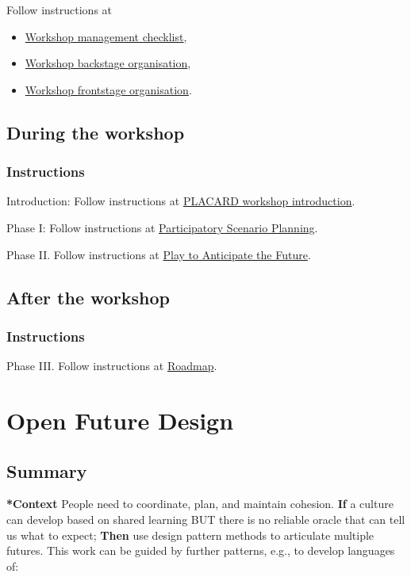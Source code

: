 \documentclass{article}
\begin{document}
Follow instructions at
\begin{itemize}
\item \hyperref[e28fb669-45a6-4916-b56b-a3afd6238d4f]{Workshop management checklist},
\item \hyperref[781d52fa-71a9-4c90-b4f6-9b0dd4244c33]{Workshop backstage organisation},
\item \hyperref[2a01f142-31c7-4e86-ae10-e14e85b4dda9]{Workshop frontstage organisation}.
\end{itemize}

\subsection{During the workshop}
\label{c8823bc4-d08e-4486-9841-c914bba9977e}
\subsubsection{Instructions}

Introduction: Follow instructions at \hyperref[b7b42aa2-c57c-4bcc-bc45-be9b63972be7]{PLACARD workshop introduction}.

Phase I: Follow instructions at \hyperref[95072d03-1359-4863-bad1-651191eb2f38]{Participatory Scenario Planning}.

Phase II. Follow instructions at \hyperref[85fefbc1-ca57-46fa-a8b2-154821a56c75]{Play to Anticipate the Future}.
\subsection{After the workshop}
\label{3d0acf49-0c87-4aaa-94b3-84e5d926d58d}
\subsubsection{Instructions}

Phase III. Follow instructions at \hyperref[92e18906-d0e6-4e73-a9cf-fbdad931f3cf]{Roadmap}.
\section{Open Future Design}
\label{66d6f9a0-c5ab-480d-8010-5c645aeadc17}
\subsection{Summary}

\textbf{*Context} People need to coordinate, plan, and maintain cohesion. \textbf{If} a
culture can develop based on shared learning BUT there is no reliable
oracle that can tell us what to expect; \textbf{Then} use design pattern
methods to articulate multiple futures. This work can be guided by
further patterns, e.g., to develop languages of:
\end{document}
